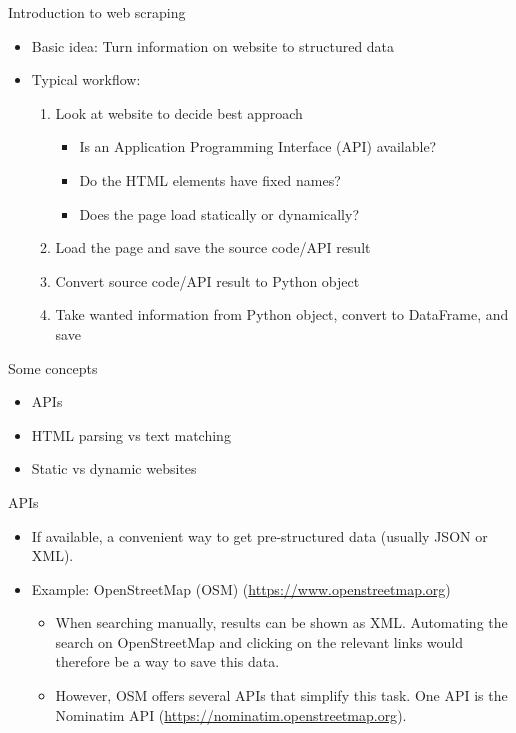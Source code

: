 \begin{frame}{Introduction to web scraping}
\begin{itemize}
	\item Basic idea: Turn information on website to structured data
	\item Typical workflow:
	\begin{enumerate}
		\item Look at website to decide best approach
		\begin{itemize}
			\item Is an Application Programming Interface (API) available?
			\item Do the HTML elements have fixed names?
			\item Does the page load statically or dynamically?
		\end{itemize}
		\item Load the page and save the source code/API result 
		\item Convert source code/API result to Python object
		\item Take wanted information from Python object, convert to DataFrame, and save
	\end{enumerate}
\end{itemize}
\end{frame}

\begin{frame}{Some concepts}
\begin{itemize}
	\item APIs
	\item HTML parsing vs text matching
	\item Static vs dynamic websites
\end{itemize}
\end{frame}

\begin{frame}{APIs}
\begin{itemize}
	\item If available, a convenient way to get pre-structured data (usually JSON or XML).
	\item Example: OpenStreetMap (OSM) (\url{https://www.openstreetmap.org})
	\begin{itemize}
		\item When searching manually, results can be shown as XML. Automating the search on OpenStreetMap and clicking on the relevant links would therefore be a way to save this data.
		\item However, OSM offers several APIs that simplify this task. One API is the Nominatim API (\url{https://nominatim.openstreetmap.org}).
	\end{itemize}
\end{itemize}
\end{frame}

